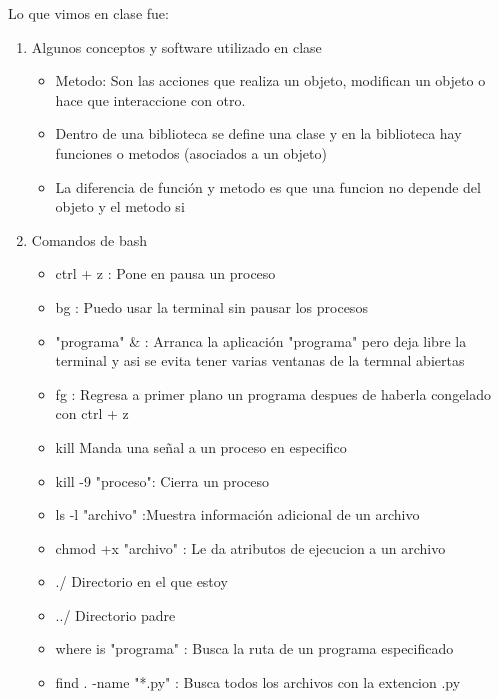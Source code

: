 \documentclass[letterpaper, 12pt, oneside]{article}%
\begin{document}
	Lo que vimos en clase fue:
	\begin{enumerate}%
		\item Algunos conceptos y software utilizado en clase%
		\begin{itemize}
			\item Metodo: Son las acciones que realiza un objeto, modifican un objeto o hace que interaccione con otro.
			\item Dentro de una biblioteca se define una clase y en la biblioteca hay funciones o metodos (asociados a un objeto)	
			\item La diferencia de función y metodo es que una funcion no depende del objeto y el metodo si
			
		\end{itemize}
		
		\item Comandos de bash%
		\begin{itemize}%
			\item ctrl + z : Pone en pausa un proceso
			\item bg : Puedo usar la terminal sin pausar los procesos
			\item "programa" \& : Arranca la aplicación "programa" pero deja libre la terminal y asi se evita tener varias ventanas de la termnal abiertas
			\item fg : Regresa a primer plano un programa despues de haberla congelado con ctrl + z
			\item kill Manda una señal a un proceso en especifico
			\item kill -9 "proceso": Cierra un proceso
			\item ls -l "archivo" :Muestra información adicional de un archivo
			\item chmod +x "archivo" : Le da atributos de ejecucion a un archivo
			\item ./ Directorio en el que estoy
			\item ../ Directorio padre
			\item where is "programa" : Busca la ruta de un programa especificado
			\item find . -name "*.py" : Busca todos los archivos con la extencion .py
		

\end{itemize}
\end{enumerate}
\end{document}
